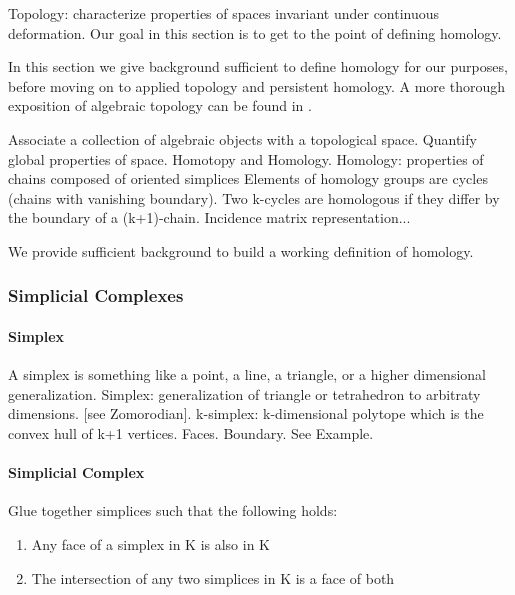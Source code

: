Topology: characterize properties of spaces invariant under continuous deformation.
Our goal in this section is to get to the point of defining homology.

In this section we give background sufficient to define homology for our purposes, before moving on to applied topology and persistent homology.
A more thorough exposition of algebraic topology can be found in \cite{Hatcher:2002ut}.

Associate a collection of algebraic objects with a topological space.
Quantify global properties of space.
Homotopy and Homology.
Homology: properties of chains composed of oriented simplices
Elements of homology groups are cycles (chains with vanishing boundary).
Two k-cycles are homologous if they differ by the boundary of a (k+1)-chain.
Incidence matrix representation...

We provide sufficient background to build a working definition of homology.

\subsubsection{Simplicial Complexes}

\paragraph{Simplex}

A simplex is something like a point, a line, a triangle, or a higher dimensional generalization.
Simplex: generalization of triangle or tetrahedron to arbitraty dimensions. [see Zomorodian].
k-simplex: k-dimensional polytope which is the convex hull of k+1 vertices.
Faces. Boundary.
See Example.

\begin{figure}
\centering
\caption[Simplices]{}
\label{background:fig:simplices}
\end{figure}

\paragraph{Simplicial Complex}

Glue together simplices such that the following holds:

\begin{enumerate}
\item Any face of a simplex in K is also in K
\item The intersection of any two simplices in K is a face of both 
\end{enumerate}

